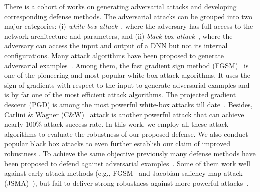 \documentclass{article}
\begin{document}
There is a cohort of works on generating adversarial attacks and developing corresponding defense methods. The adversarial attacks can be grouped into two major categories: (i) \textit{white-box attack}~\cite{szegedy2013intriguing,carlini2017towards}, where the adversary has full access to the network architecture and parameters, and (ii) \textit{black-box attack}~\cite{liu2016delving,papernot2016transferability,chen2017zoo}, where the adversary can access the input and output of a DNN but not its internal configurations. Many attack algorithms have been proposed to generate adversarial examples~\cite{szegedy2013intriguing,kurakin2016adversarial,kos2017delving,papernot2016limitations,moosavi2016deepfool,athalye2018obfuscated,chen2017ead,carlini2017towards}. Among them, the fast gradient sign method (FGSM)~\cite{goodfellow2014explaining} is one of the pioneering and most popular white-box attack algorithms. It uses the sign of gradients with respect to the input to generate adversarial examples and is by far one of the most efficient attack algorithms. The projected gradient descent (PGD) is among the most powerful white-box attacks till date~\cite{madry2017towards}. Besides, Carlini \& Wagner (C\&W)~\cite{carlini2017towards} attack is another powerful attack that can achieve nearly 100\% attack success rate. In this work, we employ all these attack algorithms to evaluate the robustness of our proposed defense. We also conduct popular black box attacks to even further establish our claim of improved robustness \cite{chen2017zoo,papernot2017practical}. To achieve the same objective previously many defense methods have been proposed to defend against adversarial examples~\cite{gu2014towards,papernot2016distillation,papernot2016towards,xu2017feature}. Some of them work well against early attack methods (e.g., FGSM~\cite{goodfellow2014explaining} and Jacobian saliency map attack (JSMA)~\cite{papernot2016limitations}), but fail to deliver strong robustness against more powerful attacks~\cite{madry2017towards,carlini2017towards,athalye2018obfuscated}.



\end{document}
